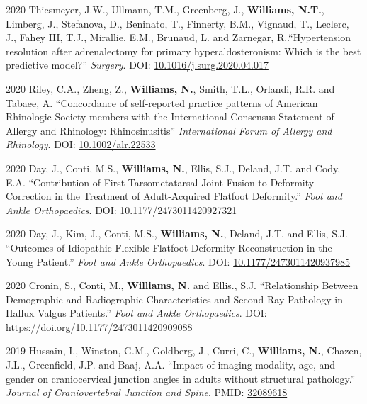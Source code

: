 \documentclass[12pt,letterpaper]{report}
\begin{document}
\begin{tablist}
    \item[2020] \tab Thiesmeyer, J.W., Ullmann, T.M., Greenberg, J., \textbf{Williams, N.T.}, Limberg, J., Stefanova, D., Beninato, T., Finnerty, B.M., Vignaud, T., Leclerc, J., Fahey III, T.J., Mirallie, E.M., Brunaud, L. and Zarnegar, R..\enquote{Hypertension resolution after adrenalectomy for primary hyperaldosteronism: Which is the best predictive model?} \textit{Surgery}. DOI: \href{https://doi.org/10.1016/j.surg.2020.04.017}{10.1016/j.surg.2020.04.017}  
	
	\item[2020] \tab Riley, C.A., Zheng, Z., \textbf{Williams, N.}, Smith, T.L., Orlandi, R.R. and Tabaee, A. \enquote{Concordance of self‐reported practice patterns of American Rhinologic Society members with the International Consensus Statement of Allergy and Rhinology: Rhinosinusitis} \textit{International Forum of Allergy and Rhinology}. DOI: \href{https://doi.org/10.1002/alr.22533}{10.1002/alr.22533} 
	
	\item[2020] \tab Day, J., Conti, M.S., \textbf{Williams, N.}, Ellis, S.J., Deland, J.T. and Cody, E.A. \enquote{Contribution of First-Tarsometatarsal Joint Fusion to Deformity Correction in the Treatment of Adult-Acquired Flatfoot Deformity.} \textit{Foot and Ankle Orthopaedics}. DOI: \href{https://doi.org/10.1177/2473011420927321}{10.1177/2473011420927321}
	
	\item[2020] \tab Day, J., Kim, J., Conti, M.S., \textbf{Williams, N.}, Deland, J.T. and Ellis, S.J. \enquote{Outcomes of Idiopathic Flexible Flatfoot Deformity Reconstruction in the Young Patient.} \textit{Foot and Ankle Orthopaedics}. DOI: \href{https://doi.org/10.1177/2473011420937985}{10.1177/2473011420937985}
	
	\item[2020] \tab Cronin, S., Conti, M., \textbf{Williams, N.} and Ellis., S.J. \enquote{Relationship Between Demographic and Radiographic Characteristics and Second Ray Pathology in Hallux Valgus Patients.} \textit{Foot and Ankle Orthopaedics}. DOI: \href{https://doi.org/10.1177/2473011420909088}{https://doi.org/10.1177/2473011420909088}

	\item[2019] \tab Hussain, I., Winston, G.M., Goldberg, J., Curri, C., \textbf{Williams, N.}, Chazen, J.L., Greenfield, J.P. and Baaj, A.A. \enquote{Impact of imaging modality, age, and gender on craniocervical junction angles in adults without structural pathology.} \textit{Journal of Craniovertebral Junction and Spine}. PMID: \href{https://www.ncbi.nlm.nih.gov/pubmed/32089618}{32089618}

    \end{tablist}
    
\end{document}
